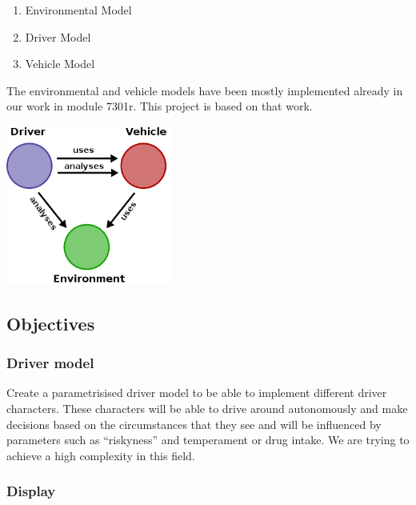 \documentclass[a4paper,10pt,titlepage]{article}
\begin{document}
\begin{enumerate}
 \item Environmental Model%
 \item Driver Model%
 \item Vehicle Model%
\end{enumerate}
The environmental and vehicle models have been mostly implemented already in our work in module 7301r. This project is based on that work.

\begin{center}
\includegraphics[width=5.5cm]{skizze.png}
\end{center}

\subsection{Objectives}
\subsubsection{Driver model}
 Create a parametrisised driver model to be able to implement different 
 driver characters. These characters will be able to drive around autonomously 
 and make decisions based on the circumstances that they see and will be 
 influenced by parameters such as ``riskyness'' and temperament or drug intake.
 We are trying to achieve a high complexity in this field.




\subsubsection{Display}
\end{document}
